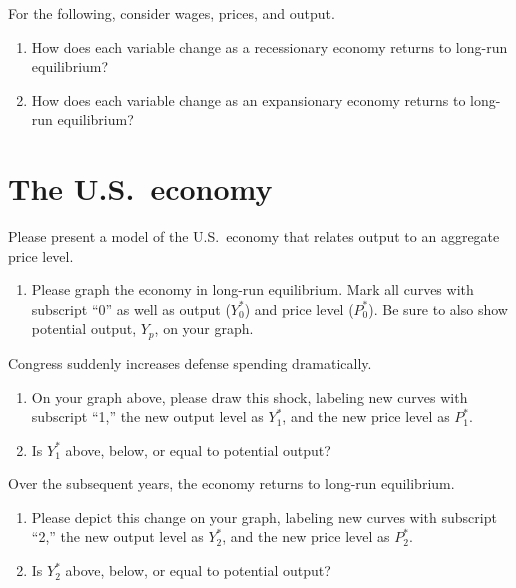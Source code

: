 \documentclass{assignment}
\begin{document}
For the following, consider wages, prices, and output.

\begin{enumerate}[resume]

\item How does each variable change as a recessionary economy returns to long-run equilibrium?

\vfill

\item How does each variable change as an expansionary economy returns to long-run equilibrium?

\vfill

\end{enumerate}

\vspace{-2.0\baselineskip}

\clearpage

\section{The U.S.~economy}

Please present a model of the U.S.~economy that relates output to an aggregate price level.

\begin{enumerate}

\item Please graph the economy in long-run equilibrium. Mark all curves with subscript ``0'' as well as output ($Y^*_0$) and price level ($P^*_0$). Be sure to also show potential output, $Y_p$, on your graph.

\vfill

\end{enumerate}

Congress suddenly increases defense spending dramatically.

\begin{enumerate}[resume]

\item On your graph above, please draw this shock, labeling new curves with subscript ``1,'' the new output level as $Y^*_1$, and the new price level as $P^*_1$.

\item Is $Y^*_1$ above, below, or equal to potential output? \hfill \underline{\hspace{3in}}

\end{enumerate}

Over the subsequent years, the economy returns to long-run equilibrium.

\begin{enumerate}[resume]

\item Please depict this change on your graph, labeling new curves with subscript ``2,'' the new output level as $Y^*_2$, and the new price level as $P^*_2$.

\item Is $Y^*_2$ above, below, or equal to potential output? \hfill \underline{\hspace{3in}}

\end{enumerate}
\end{document}
